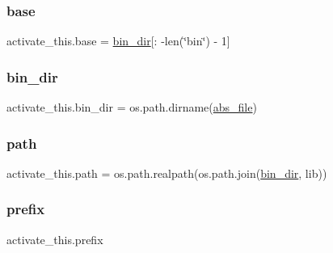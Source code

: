 \mbox{\label{namespaceactivate__this_a16f476f4fd7f92b4594cde74aa08ba0b}} 
\subsubsection{\texorpdfstring{base}{base}}
{\footnotesize\ttfamily activate\+\_\+this.\+base = \hyperlink{namespaceactivate__this_ae6aaa357f303f62b37133d8d504402e3}{bin\+\_\+dir}\mbox{[}\+: -\/len(\char`\"{}bin\char`\"{}) -\/ 1\mbox{]}}

\mbox{\label{namespaceactivate__this_ae6aaa357f303f62b37133d8d504402e3}} 
\subsubsection{\texorpdfstring{bin\+\_\+dir}{bin\_dir}}
{\footnotesize\ttfamily activate\+\_\+this.\+bin\+\_\+dir = os.\+path.\+dirname(\hyperlink{namespaceactivate__this_af88246fa4d35ab2fd5590daaf376c846}{abs\+\_\+file})}

\mbox{\label{namespaceactivate__this_a740edee9bdad5cf6c5fa9b2ad5548fcc}} 
\subsubsection{\texorpdfstring{path}{path}}
{\footnotesize\ttfamily activate\+\_\+this.\+path = os.\+path.\+realpath(os.\+path.\+join(\hyperlink{namespaceactivate__this_ae6aaa357f303f62b37133d8d504402e3}{bin\+\_\+dir}, lib))}

\mbox{\label{namespaceactivate__this_a56db7cfbbd510e1546237fae76397d47}} 
\subsubsection{\texorpdfstring{prefix}{prefix}}
{\footnotesize\ttfamily activate\+\_\+this.\+prefix}

